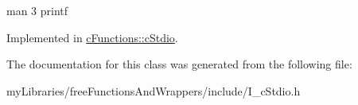 man 3 printf 

Implemented in \mbox{\hyperlink{classcFunctions_1_1cStdio_a46cf869e8b8b40e2142669f6ddcd141d}{c\+Functions\+::c\+Stdio}}.



The documentation for this class was generated from the following file\+:\begin{DoxyCompactItemize}
\item 
my\+Libraries/free\+Functions\+And\+Wrappers/include/I\+\_\+c\+Stdio.\+h\end{DoxyCompactItemize}
